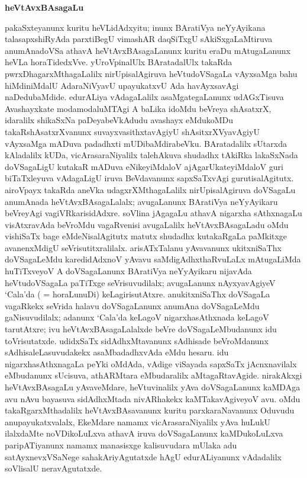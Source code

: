 \begin{center}
{\Large\bf heVtAvxBAsagaLu}
\end{center}

pakaSxteyanunx kuritu heVLidAdxyitu; inunx BAratiVya neYyAyikana talasapxshiR\-yAda parxtiBegU vimashAR daqSiTxgU sAkiSxgaLaMtiruva anumAnadoVSa athavA heVtAvx\-BAsagaLanunx kuritu eraDu mAtugaLanunx heVLa horaTidedxVve. yUroVpinalUlx BAratadalUlx takaRda pwrxDhagarxMthagaLalilx nirUpisalAgiruva heVtudoVSagaLa vAyxsaMga bahu hiMdiniMdalU AdaraNiVyavU upayukatxvU Ada havAyxsavAgi naDedu\-baMdide. edurALiya vAdagaLalilx asaMgategaLanunx udAGxTisuva Avashayxkate modamoda\-luMTAgi A baLika idoMdu beVreya shAsatxrX, idaralilx shikaSxNa paDeyabeVkAdudu avashayx eMdu\-koMDu takaRshAsatxrXvanunx suvayxvasithxtavAgiyU shAsitxrXVya\-vAgiyU vAyxsaMga mADuva padadhxti mUDibaMdirabeVku. BAratadalilx sUtarxda kAladalilx kUDa, vicArasaraNiyalilx talehAkuva shudadhx tAkiRka lakaSxNada doVSagaLigU kutakaR mADuva eNikeyiMdaloV ajAgarUkateyiMdaloV guri biTaTxleyuva vAdagaLigU iruva BeVdavanunx sapxSaTx\-vAgi gurutisalAgitutx. airoVpayx takaRda aneVka udagxrXMthagaLalilx nirUpisalAgiruva doVSa\-gaLu anumAnada heVtAvxBAsagaLalalx; avugaLanunx BAratiVya neYyAyikaru beVreyAgi vagiVRkarisidAdxre. soVlina jAgagaLu athavA nigarxha sAthxnagaLu visAtxravAda beVroMdu vagaRvenisi avugaLalilx heVtAvxBAsagaLadu oMdu vishiSaTx bage eMdeNisalAgitutx matutx shudadhx kutakaRgaLa paMkitxge avanenxMdigU seVrisutitxralilalx. arisATxTalanu yAvavanunx ukitxniSaThx  doVSagaLeMdu karedidAdxnoV yAvavu saMdigAdhxthaRvuLaLx mAtugaLiMda huTiTxveyoV A doVSagaLanunx BAratiVya neYyAyikaru nijavAda heVtudoVSagaLa paTiTxge seVrisuvudilalx; avugaLanunx nAyxyavAgiyeV `Cala'da ( = horaLunuDi) keLagirisutAtxre. anukitxniSaThx  doVSagaLa vagaRkekx seVrida halavu doVSagaLanunx anumAna doVSagaLeMdu gaNisuvudilalx; \hbox{adanunx} `Cala'da keLagoV nigarxha\-sAthxnada keLagoV tarutAtxre; ivu heVtAvxBAsagaLalalxde beVre doVSa\-gaLeMbudanunx idu toVrisutatxde. udidxSaTx sidAdhxMtavanunx sAdhisade beVroMdanunx sAdhisa\-leLasuvudakekx asaMbadadhxvAda  eMdu hesaru. idu nigarxha\-sAthxnagaLa peYki oMdAda, vAdige viSayada sapxSaTx jAcnxnavilalx eMbudanunx sUcisuva, athARMtara eMbudaralilx aMtagaRtavAgide. nirakAkxgi heVtAvxBAsagaLu yAva\-veMdare, heVtuvinalilx yAva doVSagaLanunx kaMDAga avu nAvu bayasuva sidAdhxMtada nivAR\-hakekx kaMTakavAgiveyoV avu. oMdu takaRgarxMthadalilx heVtAvxBAsavanunx kuritu parxkaraNa\-vanunx Oduvudu anupayukatxvalalx, EkeMdare namamx vicArasaraNiyalilx yAva \hbox{huLukU} ilalxdaMte noVDikoLuLxva athavA iruva doVSagaLanunx kaMDukoLuLxva paripATi\-yanunx namamx manasisxge kalisuvudara mUlaka adu satAyxnevxVSaNege sahakAriyAgutatxde hAgU edurALiyanunx vAdadalilx soVlisalU neravAgutatxde.

